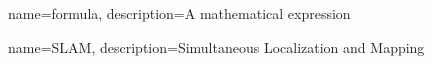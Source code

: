 \makeglossaries
 
 \makeindex
 
{
    name=formula,
    description={A mathematical expression}
}

{
    name=SLAM,
    description={Simultaneous Localization and Mapping}
}
